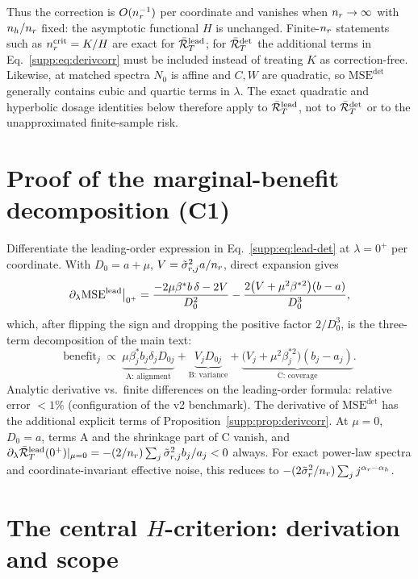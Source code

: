 Thus the correction is $O(n_r^{-1})$ per coordinate and vanishes when $n_r\to\infty$ with $n_h/n_r$ fixed: the asymptotic functional $H$ is unchanged.
Finite-$n_r$ statements such as $n_r^{\mathrm{crit}}=K/H$ are exact for $\bar{\mathcal{R}}_T^{\mathrm{lead}}$; for $\bar{\mathcal{R}}_T^{\det}$ the additional terms in Eq.~\eqref{supp:eq:derivcorr} must be included instead of treating $K$ as correction-free.
Likewise, at matched spectra $N_0$ is affine and $C,W$ are quadratic, so $\mathrm{MSE}^{\det}$ generally contains cubic and quartic terms in $\lambda$.
The exact quadratic and hyperbolic dosage identities below therefore apply to $\bar{\mathcal{R}}_T^{\mathrm{lead}}$, not to $\bar{\mathcal{R}}_T^{\det}$ or to the unapproximated finite-sample risk.

\section{Proof of the marginal-benefit decomposition (C1)}
\label{supp:c1}

Differentiate the leading-order expression in Eq.~\eqref{supp:eq:lead-det} at $\lambda = 0^+$ per coordinate.
With $D_0 = a + \mu$, $V = \tilde\sigma_{r,j}^2 a/n_r$, direct expansion gives
\begin{equation}
  \partial_\lambda \mathrm{MSE}^{\mathrm{lead}}\big|_{0^+} = \frac{-2\mu\beta^* b\, \delta - 2V}{D_0^2} - \frac{2\big(V + \mu^2\beta^{*2}\big)(b - a)}{D_0^3},
  \label{supp:eq:c1deriv}
\end{equation}
which, after flipping the sign and dropping the positive factor $2/D_0^3$, is the three-term decomposition of the main text:
\begin{equation}
  \mathrm{benefit}_j \;\propto\; \underbrace{\mu\beta^*_j b_j \delta_j D_{0j}}_{\text{A: alignment}} + \underbrace{V_j D_{0j}}_{\text{B: variance}} + \underbrace{\big(V_j + \mu^2\beta_j^{*2}\big)(b_j - a_j)}_{\text{C: coverage}} .
  \label{supp:eq:c1}
\end{equation}
Analytic derivative vs.\ finite differences on the leading-order formula: relative error $<1\%$ (configuration of the v2 benchmark).
The derivative of $\mathrm{MSE}^{\det}$ has the additional explicit terms of Proposition~\ref{supp:prop:derivcorr}.
At $\mu = 0$, $D_0 = a$, terms A and the shrinkage part of C vanish, and
$\partial_\lambda\bar{\mathcal{R}}_T^{\mathrm{lead}}(0^+)|_{\mu=0} = -(2/n_r)\sum_j \tilde\sigma_{r,j}^2 b_j/a_j < 0$ always. For exact power-law spectra and coordinate-invariant effective noise, this reduces to $-(2\tilde\sigma_r^2/n_r)\sum_j j^{\alpha_r-\alpha_h}$.

\section{The central $H$-criterion: derivation and scope}
\label{supp:h}

